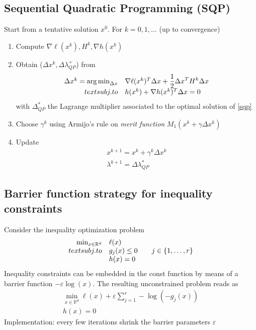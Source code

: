 \documentclass{book}
\DeclareMathOperator*{\argmin}{arg\,min}
\newcommand{\R}{\mathbb{R}}
\theoremstyle{definition}
\theoremstyle{remark}
\theoremstyle{remark}
\begin{document}
\subsection{Sequential Quadratic Programming (SQP)}
Start from a tentative solution $x^0$. For $k=0,1,\dots$ (up to convergence)
\begin{enumerate}
    \item Compute $\nabla\ell(x^k),H^k,\nabla h(x^k)$ 
    \item Obtain ($\Delta x^k, \Delta \lambda^+_{QP}$) from 
        \begin{equation}\label{sqp}
            \begin{array}{r l}
                \Delta x^k = \argmin_{\Delta x} & \nabla \ell(x^k)^T\Delta x +\displaystyle\frac{1}{2}\Delta x^TH^k \Delta x \\
                text{subj. to} & h(x^k) + \nabla h(x^k)^T \Delta x = 0
            \end{array}
        \end{equation}
        with $\Delta^*_{QP}$ the Lagrange multiplier associated to the optimal solution of \ref{sqp}
    \item Choose $\gamma^k$ using Armijo's rule on \emph{merit function} $M_1(x^k+\gamma\Delta x^k)$
    \item Update 
        \begin{gather*}
            x^{k+1} = x^k+ \gamma^k\Delta x^k \\
            \lambda^{k+1} = \Delta \lambda^*_{QP}
        \end{gather*}
\end{enumerate}

\subsection{Barrier function strategy for inequality constraints}
Consider the inequality optimization problem 
\[
    \begin{array}{r l}
        \min_{x\in\R^d} & \ell(x) \\
        text{subj. to} & g_j(x) \leq 0 \qquad j\in\{1,\dots,r\}\\
                       & h(x) = 0
    \end{array}
\]
Inequality constraints can be embedded in the const function by means of a barrier function $-\varepsilon \log(x)$. The resulting unconstrained problem reads as 
\begin{gather*}
    \min_{x\in\R^d}\ell(x) + \varepsilon\displaystyle\sum_{j=1}^{r}-\log(-g_j(x)) \\
    h(x) = 0
\end{gather*}
Implementation: every few iterations shrink the barrier parameters $\varepsilon$
\end{document}

